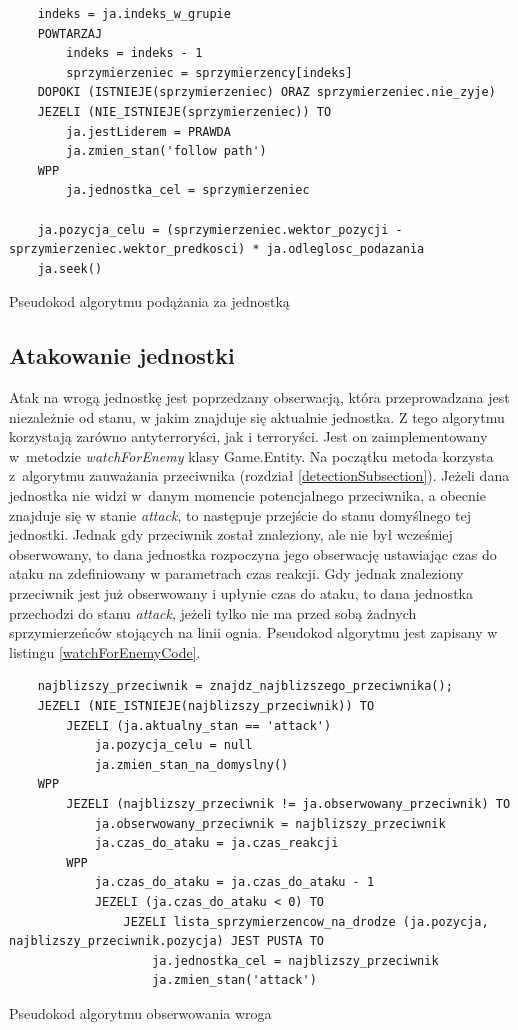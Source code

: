 \begin{table}
\begin{center}
\begin{lstlisting}
	indeks = ja.indeks_w_grupie
	POWTARZAJ
		indeks = indeks - 1
		sprzymierzeniec = sprzymierzency[indeks]
	DOPOKI (ISTNIEJE(sprzymierzeniec) ORAZ sprzymierzeniec.nie_zyje)
	JEZELI (NIE_ISTNIEJE(sprzymierzeniec)) TO
		ja.jestLiderem = PRAWDA
		ja.zmien_stan('follow path')
	WPP
		ja.jednostka_cel = sprzymierzeniec

	ja.pozycja_celu = (sprzymierzeniec.wektor_pozycji - sprzymierzeniec.wektor_predkosci) * ja.odleglosc_podazania
	ja.seek()
\end{lstlisting}
\caption {Pseudokod algorytmu podążania za jednostką}
\label{followEntityCode}
\end{center}
\end{table}

\subsection{Atakowanie jednostki}
Atak na wrogą jednostkę jest poprzedzany obserwacją, która przeprowadzana jest niezależnie od stanu, w jakim znajduje się aktualnie jednostka. Z tego algorytmu korzystają zarówno antyterroryści, jak i terroryści. Jest on zaimplementowany w~metodzie \emph{watchForEnemy} klasy Game.Entity. Na początku metoda korzysta z~algorytmu zauważania przeciwnika (rozdział \ref{detectionSubsection}). Jeżeli dana jednostka nie widzi w~danym momencie potencjalnego przeciwnika, a obecnie znajduje się w stanie \emph{attack}, to następuje przejście do stanu domyślnego tej jednostki. Jednak gdy przeciwnik został znaleziony, ale nie był wcześniej obserwowany, to dana jednostka rozpoczyna jego obserwację ustawiając czas do ataku na zdefiniowany w parametrach czas reakcji. Gdy jednak znaleziony przeciwnik jest już obserwowany i upłynie czas do ataku, to dana jednostka przechodzi do stanu \emph{attack}, jeżeli tylko nie ma przed sobą żadnych sprzymierzeńców stojących na linii ognia. Pseudokod algorytmu jest zapisany w listingu \ref{watchForEnemyCode}.

\begin{table}
\begin{center}
\begin{lstlisting}
	najblizszy_przeciwnik = znajdz_najblizszego_przeciwnika();
	JEZELI (NIE_ISTNIEJE(najblizszy_przeciwnik)) TO
		JEZELI (ja.aktualny_stan == 'attack')
			ja.pozycja_celu = null
			ja.zmien_stan_na_domyslny()
	WPP
		JEZELI (najblizszy_przeciwnik != ja.obserwowany_przeciwnik) TO
			ja.obserwowany_przeciwnik = najblizszy_przeciwnik
			ja.czas_do_ataku = ja.czas_reakcji
		WPP
			ja.czas_do_ataku = ja.czas_do_ataku - 1
			JEZELI (ja.czas_do_ataku < 0) TO
				JEZELI lista_sprzymierzencow_na_drodze (ja.pozycja, najblizszy_przeciwnik.pozycja) JEST PUSTA TO
					ja.jednostka_cel = najblizszy_przeciwnik
					ja.zmien_stan('attack')									
\end{lstlisting}
\caption {Pseudokod algorytmu obserwowania wroga}
\label{watchForEnemyCode}
\end{center}
\end{table}

